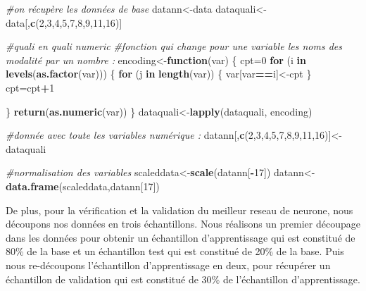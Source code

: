 \documentclass[
]{article}
\newenvironment{Shaded}{\begin{snugshade}}{\end{snugshade}}
\newcommand{\CommentTok}[1]{\textcolor[rgb]{0.56,0.35,0.01}{\textit{#1}}}
\newcommand{\ControlFlowTok}[1]{\textcolor[rgb]{0.13,0.29,0.53}{\textbf{#1}}}
\newcommand{\DecValTok}[1]{\textcolor[rgb]{0.00,0.00,0.81}{#1}}
\newcommand{\KeywordTok}[1]{\textcolor[rgb]{0.13,0.29,0.53}{\textbf{#1}}}
\newcommand{\NormalTok}[1]{#1}
\newcommand{\OperatorTok}[1]{\textcolor[rgb]{0.81,0.36,0.00}{\textbf{#1}}}
\begin{document}
\begin{Shaded}
\begin{Highlighting}[]
\CommentTok{#on récupère les données de base}
\NormalTok{datann<-data}
\NormalTok{dataquali<-data[,}\KeywordTok{c}\NormalTok{(}\DecValTok{2}\NormalTok{,}\DecValTok{3}\NormalTok{,}\DecValTok{4}\NormalTok{,}\DecValTok{5}\NormalTok{,}\DecValTok{7}\NormalTok{,}\DecValTok{8}\NormalTok{,}\DecValTok{9}\NormalTok{,}\DecValTok{11}\NormalTok{,}\DecValTok{16}\NormalTok{)]}

\CommentTok{#quali en quali numeric}
\CommentTok{#fonction qui change pour une variable les noms des modalité par un nombre :}
\NormalTok{encoding<-}\ControlFlowTok{function}\NormalTok{(var) \{}
\NormalTok{    cpt=}\DecValTok{0}
    \ControlFlowTok{for}\NormalTok{ (i }\ControlFlowTok{in} \KeywordTok{levels}\NormalTok{(}\KeywordTok{as.factor}\NormalTok{(var))) \{}
        \ControlFlowTok{for}\NormalTok{ (j }\ControlFlowTok{in} \KeywordTok{length}\NormalTok{(var)) \{}
\NormalTok{            var[var}\OperatorTok{==}\NormalTok{i]<-cpt}
\NormalTok{        \}}
\NormalTok{        cpt=cpt}\OperatorTok{+}\DecValTok{1}

\NormalTok{    \}}
    \KeywordTok{return}\NormalTok{(}\KeywordTok{as.numeric}\NormalTok{(var))}
\NormalTok{\}}
\NormalTok{dataquali<-}\KeywordTok{lapply}\NormalTok{(dataquali, encoding)}

\CommentTok{#donnée avec toute les variables numérique :}
\NormalTok{datann[,}\KeywordTok{c}\NormalTok{(}\DecValTok{2}\NormalTok{,}\DecValTok{3}\NormalTok{,}\DecValTok{4}\NormalTok{,}\DecValTok{5}\NormalTok{,}\DecValTok{7}\NormalTok{,}\DecValTok{8}\NormalTok{,}\DecValTok{9}\NormalTok{,}\DecValTok{11}\NormalTok{,}\DecValTok{16}\NormalTok{)]<-dataquali}

\CommentTok{#normalisation des variables }
\NormalTok{scaleddata<-}\KeywordTok{scale}\NormalTok{(datann[}\OperatorTok{-}\DecValTok{17}\NormalTok{])}
\NormalTok{datann<-}\KeywordTok{data.frame}\NormalTok{(scaleddata,datann[}\DecValTok{17}\NormalTok{])}
\end{Highlighting}
\end{Shaded}

De plus, pour la vérification et la validation du meilleur reseau de
neurone, nous découpons nos données en trois échantillons. Nous
réalisons un premier découpage dans les données pour obtenir un
échantillon d'apprentissage qui est constitué de 80\% de la base et un
échantillon test qui est constitué de 20\% de la base. Puis nous
re-découpons l'échantillon d'apprentissage en deux, pour récupérer un
échantillon de validation qui est constitué de 30\% de l'échantillon
d'apprentissage.
\end{document}
